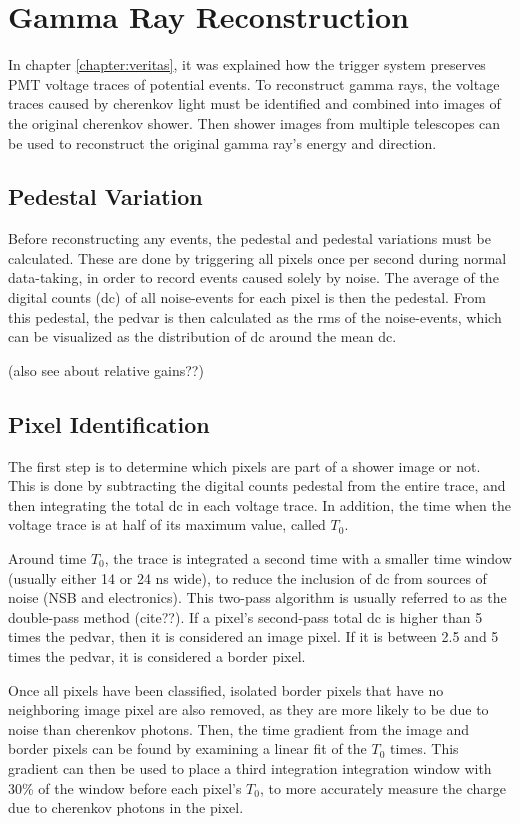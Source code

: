\cleartooddpage[\thispagestyle{empty}]
\chapter{Gamma Ray Reconstruction}\label{ch:grrecon}

In chapter \ref{chapter:veritas}, it was explained how the trigger system preserves PMT voltage traces of potential events.
To reconstruct gamma rays, the voltage traces caused by cherenkov light must be identified and combined into images of the original cherenkov shower.
Then shower images from multiple telescopes can be used to reconstruct the original gamma ray's energy and direction.

\section{Pedestal Variation}
Before reconstructing any events, the pedestal and pedestal variations must be calculated.
These are done by triggering all pixels once per second during normal data-taking, in order to record events caused solely by noise.
The average of the digital counts (dc) of all noise-events for each pixel is then the pedestal.
From this pedestal, the pedvar is then calculated as the rms of the noise-events, which can be visualized as the distribution of dc around the mean dc.

(also see \cite{Hanna2010NIM} about relative gains??)

\section{Pixel Identification}
The first step is to determine which pixels are part of a shower image or not.
This is done by subtracting the digital counts pedestal from the entire trace, and then integrating the total dc in each voltage trace.
In addition, the time when the voltage trace is at half of its maximum value, called $T_{0}$.

Around time $T_{0}$, the trace is integrated a second time with a smaller time window (usually either 14 or 24 ns wide), to reduce the inclusion of dc from sources of noise (NSB and electronics).
This two-pass algorithm is usually referred to as the double-pass method (cite??).
If a pixel's second-pass total dc is higher than 5 times the pedvar, then it is considered an image pixel.
If it is between 2.5 and 5 times the pedvar, it is considered a border pixel.

Once all pixels have been classified, isolated border pixels that have no neighboring image pixel are also removed, as they are more likely to be due to noise than cherenkov photons.
Then, the time gradient from the image and border pixels can be found by examining a linear fit of the $T_{0}$ times.
This gradient can then be used to place a third integration integration window with 30\% of the window before each pixel's $T_{0}$, to more accurately measure the charge due to cherenkov photons in the pixel.

